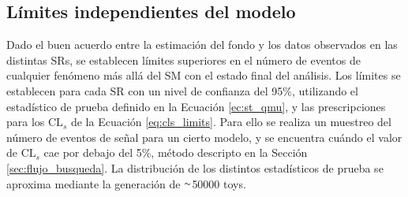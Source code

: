 \begin{table}[ht!]
\begin{tabular}{lccc}
      \hline
      \hline
    \end{tabular}
\label{tab:syst_rel_impact}
\end{table}




\subsection{Límites independientes del modelo}


Dado el buen acuerdo entre la estimación del fondo y los datos observados en las distintas SRs, se establecen límites superiores en el número de eventos de cualquier fenómeno más allá del SM con el estado final del análisis. Los límites se establecen para cada SR con un nivel de confianza del 95\%, utilizando el estadístico de prueba definido en la Ecuación \ref{ec:st_qmu}, y las prescripciones para los $\text{CL}_{s}$ de la Ecuación \ref{eq:cls_limits}. Para ello se realiza un muestreo del número de eventos de señal para un cierto modelo, y se encuentra cuándo el valor de $\text{CL}_{s}$ cae por debajo del 5\%, método descripto en la Sección \ref{sec:flujo_busqueda}. La distribución de los distintos estadísticos de prueba se aproxima mediante la generación de {$\smallsim$}50000 toys.


